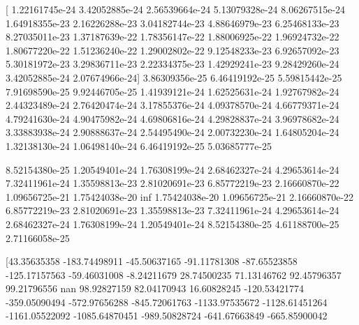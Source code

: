 

[  1.22161745e-24   3.42052885e-24
 2.56539664e-24   5.13079328e-24
   8.06267515e-24   1.64918355e-23
    2.16226288e-23   3.04182744e-23
   4.88646979e-23   6.25468133e-23
    8.27035011e-23   1.37187639e-22
   1.78356147e-22   1.88006925e-22
    1.96924732e-22   1.80677220e-22
   1.51236240e-22   1.29002802e-22
    9.12548233e-23   6.92657092e-23
   5.30181972e-23   3.29836711e-23
    2.22334375e-23   1.42929241e-23
   9.28429260e-24   3.42052885e-24
    2.07674966e-24]
3.86309356e-25   6.46419192e-25
5.59815442e-25   7.91698590e-25
9.92446705e-25   1.41939121e-24
1.62525631e-24   1.92767982e-24
2.44323489e-24   2.76420474e-24
3.17855376e-24   4.09378570e-24
4.66779371e-24   4.79241630e-24
4.90475982e-24   4.69806816e-24
4.29828837e-24   3.96978682e-24
3.33883938e-24   2.90888637e-24
2.54495490e-24   2.00732230e-24
1.64805204e-24   1.32138130e-24
1.06498140e-24   6.46419192e-25
5.03685777e-25


8.52154380e-25   1.20549401e-24
1.76308199e-24   2.68462327e-24
   4.29653614e-24   7.32411961e-24
    1.35598813e-23   2.81020691e-23
   6.85772219e-23   2.16660870e-22
    1.09656725e-21   1.75424038e-20
              inf   1.75424038e-20
               1.09656725e-21   2.16660870e-22
   6.85772219e-23   2.81020691e-23
    1.35598813e-23   7.32411961e-24
   4.29653614e-24   2.68462327e-24
    1.76308199e-24   1.20549401e-24
   8.52154380e-25   4.61188700e-25
    2.71166058e-25



    [43.35635358  -183.74498911
       -45.50637165   -91.11781308   -87.65523858
  -125.17157563   -59.46031008
     -8.24211679    28.74500235    71.13146762
    92.45796357    99.21796556
               nan    98.92827159    82.04170943
    16.60828245  -120.53421774
     -359.05090494  -572.97656288  -845.72061763
 -1133.97535672 -1128.61451264
 -1161.05522092 -1085.64870451  -989.50828724
  -641.67663849  -665.85900042
  
